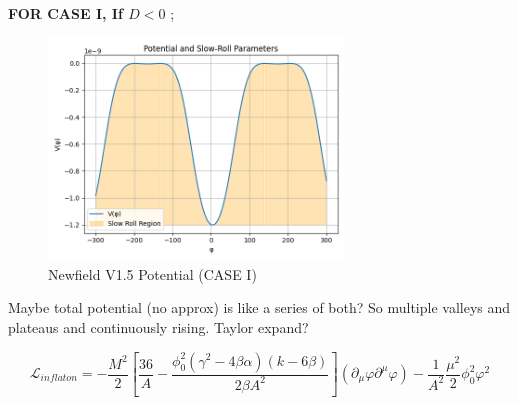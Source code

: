 \documentclass{article}
\begin{document}
\textbf{FOR CASE I, If $D < 0$ };
\begin{figure}[h!]
    \centering
    \includegraphics[width=0.7\textwidth]{Python/Figures/New Potenial V1,5 with gravity.png}
    \caption{Newfield V1.5 Potential (CASE I)}
    \label{Newfield V1.5 as func of N}
\end{figure}

Maybe total potential (no approx) is like a series of both? So multiple valleys and plateaus and continuously rising. Taylor expand?

\begin{equation}
    \mathcal{L}_{inflaton} = - \frac{M^2}{2} \left[\frac{36}{A} - \frac{\phi_0^2 (\gamma^2 - 4\beta\alpha)(k-6\beta)}{2\beta A^2}\right] (\partial_\mu \varphi \partial^\mu \varphi) -  \frac{1}{A^2} \frac{\mu^2}{2} \phi^2_0 \varphi^2 
\end{equation}


\newpage

\printbibliography
\end{document}
